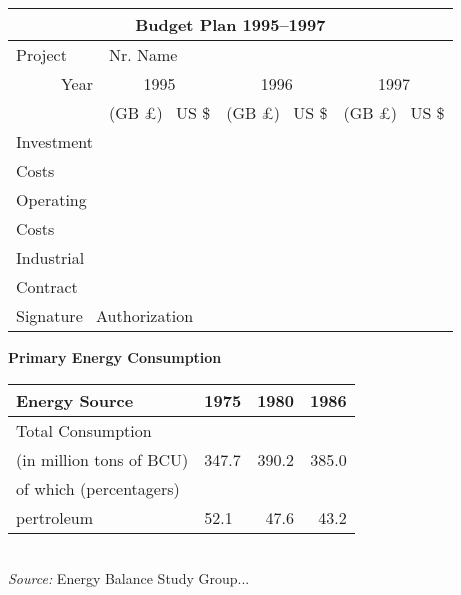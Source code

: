\documentclass[12pt,twoside,a4paper]{article}   %
\begin{document}
	\begin{tabular} {|l|c|c|c|}\hline
		\multicolumn{4}{|c|}{\rule[-0.3cm]{0mm}{0.8cm}\bfseries Budget Plan 1995--1997}\\
		\hline\hline
		\rule[-0.4cm]{0mm}{1cm}Project & \multicolumn{3}{l|}{Nr. \usebox{\kkk}\hspace{0.5cm} \vline \hspace{0.5cm} Name \usebox{\kkk}\usebox{\kkk}\usebox{\kkk}\usebox{\kkk}}\\ \hline
		\multicolumn{1}{|r|}{Year} & 1995 &1996 & 1997 \\
		\cline{2-4}
		& (GB \pounds) \vline\ US \$ & (GB \pounds) \vline\ US \$ & (GB \pounds) \vline\ US \$ \\ \hline
		Investment & \hspace{2.5cm} & \hspace{2.5cm} & \hspace{2.5cm} \\
		Costs & & & \\ \hline
		Operating & & & \\
		Costs & & & \\ \hline
		Industrial & & & \\
		Contract & & & \\ \hline
		\multicolumn{4}{|l|}{\rule[-1.2cm]{0mm}{1.5cm}Signature \hspace{5cm}\vline~Authorization} \\ \hline
	\end{tabular}
	\begin{table}{\bfseries Primary Energy Consumption} \\ [1ex]
		\begin{tabular*}{118mm}{@{}llrr@{}}
		Energy Source & 1975 & 1980 & 1986 \\ \hline
		\cline{1-4}
		Total Consumption\\
		(in million tons of BCU) & 347.7 & 390.2 & 385.0 \\
		of which (percentagers) \\
			pertroleum & 52.1 & 47.6 & 43.2 \\
		\end{tabular*} \\ [0.5ex]
		\emph{Source:} Energy Balance Study Group...
	\end{table}

	\newpage
	
\end{document}
